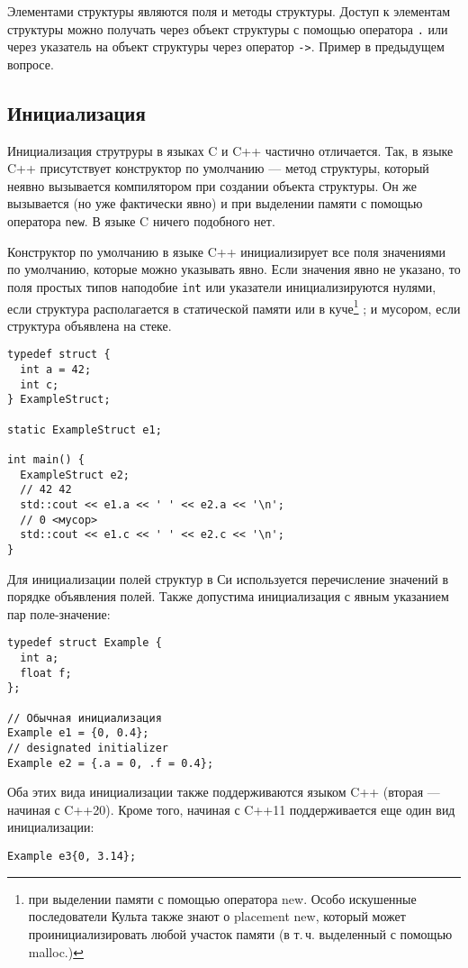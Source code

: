 Элементами структуры являются поля и методы структуры.
Доступ к элементам структуры можно получать через объект структуры
с помощью оператора \verb|.| или через указатель на объект структуры через оператор \verb|->|.
Пример в предыдущем вопросе.

\subsection{Инициализация}

Инициализация струтруры в языках C и C++ частично отличается. Так, в языке C++
присутствует конструктор по умолчанию --- метод структуры, который неявно
вызывается компилятором при создании объекта структуры. Он же вызывается (но
уже фактически явно) и при выделении памяти с помощью оператора \verb|new|.
В языке C ничего подобного нет.

Конструктор по умолчанию в языке C++ инициализирует все поля значениями по
умолчанию, которые можно указывать явно. Если значения явно не указано, то
поля простых типов наподобие \verb|int| или указатели инициализируются нулями,
если структура располагается в статической памяти или в куче\footnote{при
выделении памяти с помощью оператора new. Особо искушенные последователи Культа
также знают о placement new, который может проинициализировать любой участок памяти (в
т.\,ч. выделенный с помощью malloc.)}
; и мусором, если
структура объявлена на стеке.
\begin{verbatim}
typedef struct {
  int a = 42;
  int c;
} ExampleStruct;

static ExampleStruct e1;

int main() {
  ExampleStruct e2;
  // 42 42
  std::cout << e1.a << ' ' << e2.a << '\n';
  // 0 <мусор>
  std::cout << e1.c << ' ' << e2.c << '\n';
}
\end{verbatim}

Для инициализации полей структур в Си используется перечисление значений
в порядке объявления полей. Также допустима инициализация с явным указанием
пар поле-значение:
\begin{verbatim}
typedef struct Example {
  int a;
  float f;
};

// Обычная инициализация
Example e1 = {0, 0.4};
// designated initializer
Example e2 = {.a = 0, .f = 0.4};
\end{verbatim}

Оба этих вида инициализации также поддерживаются языком C++ (вторая --- начиная с C++20).
Кроме того, начиная с C++11 поддерживается еще один вид инициализации:
\begin{verbatim}
Example e3{0, 3.14};
\end{verbatim}

